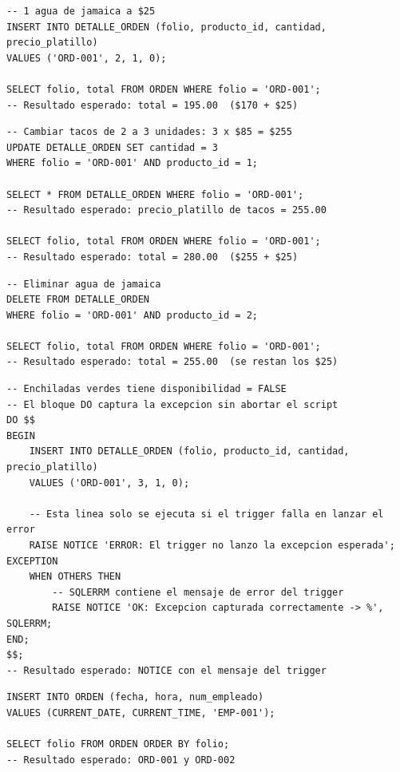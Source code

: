 \documentclass[12pt, a4paper]{article}
\begin{document}
\begin{lstlisting}[caption={Prueba 3: Acumulaci\'on de total}]
-- 1 agua de jamaica a $25
INSERT INTO DETALLE_ORDEN (folio, producto_id, cantidad, precio_platillo)
VALUES ('ORD-001', 2, 1, 0);

SELECT folio, total FROM ORDEN WHERE folio = 'ORD-001';
-- Resultado esperado: total = 195.00  ($170 + $25)
\end{lstlisting}

\begin{lstlisting}[caption={Prueba 4: UPDATE de cantidad}]
-- Cambiar tacos de 2 a 3 unidades: 3 x $85 = $255
UPDATE DETALLE_ORDEN SET cantidad = 3
WHERE folio = 'ORD-001' AND producto_id = 1;

SELECT * FROM DETALLE_ORDEN WHERE folio = 'ORD-001';
-- Resultado esperado: precio_platillo de tacos = 255.00

SELECT folio, total FROM ORDEN WHERE folio = 'ORD-001';
-- Resultado esperado: total = 280.00  ($255 + $25)
\end{lstlisting}

\begin{lstlisting}[caption={Prueba 5: DELETE de un rengl\'on}]
-- Eliminar agua de jamaica
DELETE FROM DETALLE_ORDEN
WHERE folio = 'ORD-001' AND producto_id = 2;

SELECT folio, total FROM ORDEN WHERE folio = 'ORD-001';
-- Resultado esperado: total = 255.00  (se restan los $25)
\end{lstlisting}

\begin{lstlisting}[caption={Prueba 6: Producto no disponible}]
-- Enchiladas verdes tiene disponibilidad = FALSE
-- El bloque DO captura la excepcion sin abortar el script
DO $$
BEGIN
    INSERT INTO DETALLE_ORDEN (folio, producto_id, cantidad, precio_platillo)
    VALUES ('ORD-001', 3, 1, 0);

    -- Esta linea solo se ejecuta si el trigger falla en lanzar el error
    RAISE NOTICE 'ERROR: El trigger no lanzo la excepcion esperada';
EXCEPTION
    WHEN OTHERS THEN
        -- SQLERRM contiene el mensaje de error del trigger
        RAISE NOTICE 'OK: Excepcion capturada correctamente -> %', SQLERRM;
END;
$$;
-- Resultado esperado: NOTICE con el mensaje del trigger
\end{lstlisting}

\begin{lstlisting}[caption={Prueba 7: Segunda orden con folio incremental}]
INSERT INTO ORDEN (fecha, hora, num_empleado)
VALUES (CURRENT_DATE, CURRENT_TIME, 'EMP-001');

SELECT folio FROM ORDEN ORDER BY folio;
-- Resultado esperado: ORD-001 y ORD-002
\end{lstlisting}
\end{document}
